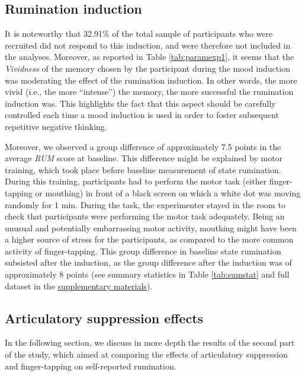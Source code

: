 \documentclass[a4paper,12pt,twoside,onecolumn,openright,final,oldfontcommands]{memoir}
\begin{document}
\hypertarget{rumination-induction-4}{%
\subsection{Rumination induction}\label{rumination-induction-4}}

It is noteworthy that 32.91\% of the total sample of participants who were recruited did not respond to this induction, and were therefore not included in the analyses. Moreover, as reported in Table \ref{tab:paramexp1}, it seems that the \emph{Vividness} of the memory chosen by the participant during the mood induction was moderating the effect of the rumination induction. In other words, the more vivid (i.e., the more \enquote{intense}) the memory, the more successful the rumination induction was. This highlights the fact that this aspect should be carefully controlled each time a mood induction is used in order to foster subsequent repetitive negative thinking.

Moreover, we observed a group difference of approximately 7.5 points in the average \emph{RUM} score at baseline. This difference might be explained by motor training, which took place before baseline measurement of state rumination. During this training, participants had to perform the motor task (either finger-tapping or mouthing) in front of a black screen on which a white dot was moving randomly for 1 min. During the task, the experimenter stayed in the room to check that participants were performing the motor task adequately. Being an unusual and potentially embarrassing motor activity, mouthing might have been a higher source of stress for the participants, as compared to the more common activity of finger-tapping. This group difference in baseline state rumination subsisted after the induction, as the group difference after the induction was of approximately 8 points (see summary statistics in Table \ref{tab:sumstat} and full dataset in the \protect\hyperlink{supp}{supplementary materials}).

\hypertarget{articulatory-suppression-effects-1}{%
\subsection{Articulatory suppression effects}\label{articulatory-suppression-effects-1}}

In the following section, we discuss in more depth the results of the second part of the study, which aimed at comparing the effects of articulatory suppression and finger-tapping on self-reported rumination.
\end{document}
